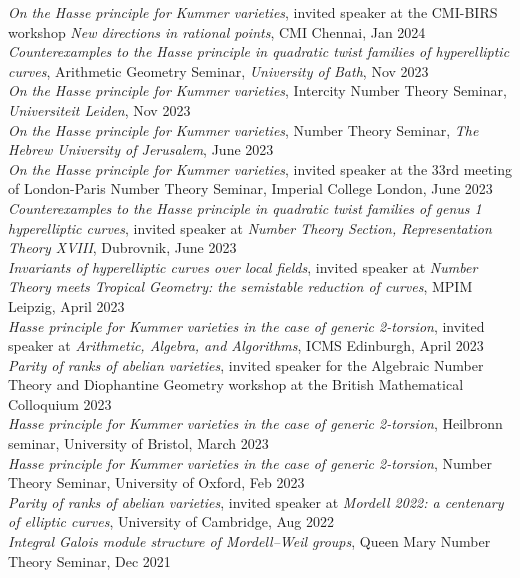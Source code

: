\documentclass{res}
\begin{document}
\begin{resume}
 \medskip
   {\it  On the Hasse principle for Kummer varieties}, invited speaker at the CMI-BIRS workshop \textit{New directions in rational points}, CMI Chennai,   Jan 2024    \medskip  \\
 {\it  Counterexamples to the Hasse principle in quadratic twist families of hyperelliptic curves}, Arithmetic Geometry Seminar, {\it University of Bath}, Nov 2023    \medskip  \\
  {\it  On the Hasse principle for Kummer varieties}, Intercity Number Theory Seminar, {\it Universiteit Leiden}, Nov 2023    \medskip  \\
{\it  On the Hasse principle for Kummer varieties}, Number Theory Seminar, {\it The Hebrew University of Jerusalem}, June 2023    \medskip  \\
{\it  On the Hasse principle for Kummer varieties}, invited speaker at the 33rd meeting of London-Paris Number Theory Seminar, Imperial College London, June 2023    \medskip  \\
{\it  Counterexamples to the Hasse principle in quadratic twist families of genus 1
hyperelliptic curves}, invited speaker at {\it Number Theory Section, Representation Theory XVIII}, Dubrovnik, June 2023    \medskip  \\
{\it  Invariants of hyperelliptic curves over local fields}, invited speaker at {\it Number Theory meets Tropical Geometry: the semistable reduction of curves}, MPIM Leipzig, April 2023    \medskip  \\
{\it  Hasse principle for Kummer varieties in the case of generic 2-torsion}, invited speaker at {\it Arithmetic, Algebra, and Algorithms}, ICMS Edinburgh, April 2023    \medskip  \\
{\it  Parity of ranks of abelian varieties}, invited speaker for the Algebraic Number Theory and Diophantine Geometry workshop at the British Mathematical Colloquium 2023 \medskip  \\
{\it  Hasse principle for Kummer varieties in the case of generic 2-torsion}, Heilbronn seminar, University of Bristol, March 2023    \medskip  \\
{\it  Hasse principle for Kummer varieties in the case of generic 2-torsion}, Number Theory Seminar, University of Oxford, Feb 2023    \medskip  \\
{\it  Parity of ranks of abelian varieties}, invited speaker at {\it Mordell 2022: a centenary of elliptic curves}, University of Cambridge, Aug 2022    \medskip  \\
{\it  Integral Galois module structure of Mordell--Weil groups}, Queen Mary Number Theory Seminar, Dec 2021   \medskip  \\

\end{resume}
\end{document}
